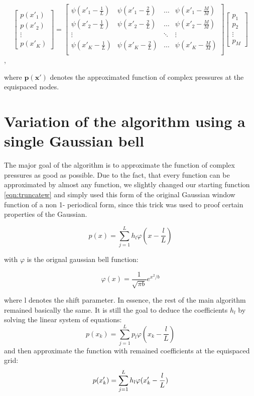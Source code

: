 \documentclass[11pt]{report} %
\begin{document}
\[
\begin{bmatrix}
	p(x'_1) \\
	p(x'_2) \\
	\vdots\\
	p(x'_K)
\end{bmatrix} = 
\begin{bmatrix}
    \psi(x'_{1}-\frac{1}{L})& \psi(x'_{1}-\frac{2}{L})& \dots & \psi(x'_{1}-\frac{M}{M}) \\
    \psi(x'_{2}-\frac{1}{L})& \psi(x'_{2}-\frac{2}{L})& \dots & \psi(x'_{2}-\frac{M}{M}) \\
    \vdots &  &\ddots & \vdots \\
    \psi(x'_{K}-\frac{1}{L})& \psi(x'_{K}-\frac{2}{L})& \dots & \psi(x'_{K}-\frac{M}{M}) \\   
\end{bmatrix}
\begin{bmatrix}
    p_1 \\
    p_2 \\
    \vdots \\
    p_{M}
\end{bmatrix}
\],

where $\bm{p(x')}$ denotes the approximated function of complex pressures at the equispaced nodes. 

\section{Variation of the algorithm using a single Gaussian bell}
The major goal of the algorithm is to approximate the function of complex pressures as good as possible.
Due to the fact, that every function can be approximated by almost any function, we slightly changed our starting function \eqref{eqn:truncatew} and simply used this form of the original Gaussian window function of a non 1- periodical form, since this trick was used to proof certain properties of the Gaussian.
  
\begin{equation}
 p(x)=\sum\limits_{j=1}^L h_{l}\varphi(x-\frac{l}{L})
\end{equation}

with $\varphi$ is the orignal gaussian bell function: 

\begin{equation}
\varphi(x)= \frac{1}{\sqrt{\pi b}}  e^{x^2/b}
\end{equation}

where l denotes the shift parameter.
In essence, the rest of the main algorithm remained basically the same.
It is still the goal to deduce the coefficients $h_{l}$ by solving the linear system of equations: 
\begin{equation}
p(x_{k})=\sum\limits_{j=1}^L p_{l}\varphi(x_{k}-\frac{l}{L})
\end{equation}
and then approximate the function with remained coefficients at the equispaced grid: 
\begin{equation}
p(x'_{k})= \sum\limits_{j=1}^L h_{l}\varphi(x'_{k}-\frac{l}{L}) \notag
\end{equation}
\end{document}
